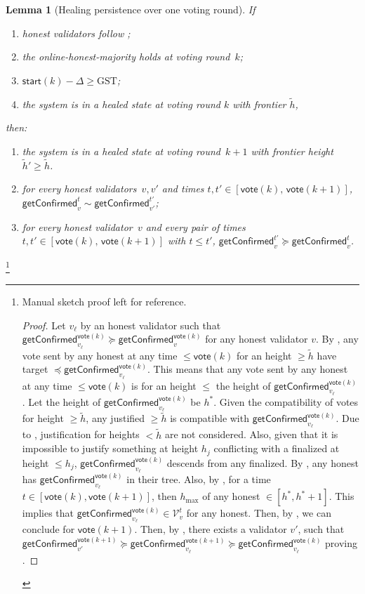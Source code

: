 \ifx\litemode\undefined\documentclass{article}\fi
\newcommand{\V}[0]{\ensuremath{\mathcal{V}}}
\newcommand{\hmax}{\ensuremath{h_{\max}}\xspace}
\newcommand{\start}{\ensuremath{\mathsf{start}}}
\newcommand{\vote}{\ensuremath{\mathsf{vote}}}
\newcommand{\GST}{\ensuremath{\mathrm{GST}}\xspace}
\newcommand{\comm}[1]{\ensuremath{\widetilde{#1}}}
\newcommand{\getConfirmed}{\textsf{getConfirmed}\xspace}
\theoremstyle{plain}
\newtheorem{lemma}{Lemma}
\theoremstyle{definition}
\theoremstyle{remark}
\begin{document}
\begin{lemma}[Healing persistence over one voting round]\label{lem:healing-persistence}
If
\begin{enumerate}
  \item\label{rev:hp:f} honest validators follow ;
  \item\label{rev:hp:ohm} the online-honest-majority holds at voting round~$k$;
  \item\label{rev:hp:sync} $\start(k) - \Delta \geq \GST$;
  \item\label{rev:hp:hs} the system is in a healed state at voting round $k$ with frontier $\comm{h}$,
\end{enumerate}
then:
\begin{enumerate}
  \item the system is in a healed state at voting round~$k+1$ with frontier height $\comm{h}' \geq \comm{h}$.
  \item for every honest validators~$v,v'$ and times $t, t' \in [\vote(k),\, \vote(k+1)]$, $\getConfirmed_v^{t} \sim \getConfirmed_{v'}^{t'}$;
  \item for every honest validator~$v$ and every pair of times $t, t' \in [\vote(k),\, \vote(k+1)]$ with $t \leq t'$, $\getConfirmed_v^{t'} \succeq \getConfirmed_v^t$.
\end{enumerate}
\end{lemma}

\iffull
\footnote{
Manual sketch proof left for reference.
\begin{proof}
  Let $v_\ell$ by an honest validator such that $\getConfirmed_{v_\ell}^{\vote(k)}\succeq \getConfirmed_v^{\vote(k)}$ for any honest validator $v$.
  By , any vote sent by any honest at any time $\leq \vote(k)$ for an height $\geq \comm{h}$ have target $\preceq \getConfirmed_{v_\ell}^{\vote(k)}$.
  This means that any vote sent by any honest at any time $\leq \vote(k)$ is for an height $\leq $ the height of $\getConfirmed_{v_\ell}^{\vote(k)}$.
  Let the height of $\getConfirmed_{v_\ell}^{\vote(k)}$ be $h^*$.
  Given the compatibility of votes for height $\geq \comm{h}$, any justified $\geq \comm{h}$ is compatible with $\getConfirmed_{v_\ell}^{\vote(k)}$.
  Due to , justification for heights $< \comm{h}$ are not considered.
  Also, given that it is impossible to justify something at height $h_j$ conflicting with a finalized at height $\leq h_j$, $\getConfirmed_{v_\ell}^{\vote(k)}$ descends from any finalized.
  By , any honest has  $\getConfirmed_{v_\ell}^{\vote(k)}$ in their tree.
  Also, by , for a time $t \in [\vote(k),\vote(k+1)]$, then $\hmax$ of any honest  $\in [h^*,h^*+1]$. 
  This implies that  $\getConfirmed_{v_\ell}^{\vote(k)} \in \V_v^t$ for any honest.
  Then, by , we can conclude  for $\vote(k+1)$.
  Then, by , there exists a validator $v'$, such that $\getConfirmed_{v'}^{\vote(k+1)}\succeq \getConfirmed_{v_\ell}^{\vote(k+1)}\succeq \getConfirmed_{v_\ell}^{\vote(k)}$ proving .
\end{proof}}
\fi
\end{document}
